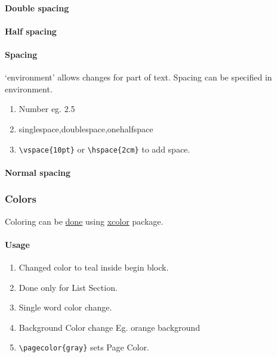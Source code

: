 \documentclass{report}[a4paper,12pt] %
\begin{document}
\paragraph{Double spacing}
\doublespacing
\lipsum[1]

\paragraph{Half spacing}
\onehalfspacing
\lipsum[1]

\begin{spacing}{2.5}
\paragraph{Spacing} `environment' allows changes for part of text.
Spacing can be specified in environment.
\begin{enumerate}
  \item Number eg. 2.5
  \item singlespace,doublespace,onehalfspace
  \item \verb|\vspace{10pt}| or \verb|\hspace{2cm}| to add space.
\end{enumerate}

\lipsum[1]
\end{spacing}

\paragraph{Normal spacing}
\lipsum[1]

\subsubsection{Colors}
Coloring can be \href{https://www.overleaf.com/learn/latex/Using_colours_in_LaTeX}{done} using \href{https://mirrors.sjtug.sjtu.edu.cn/ctan/macros/latex/contrib/xcolor/xcolor.pdf}{xcolor} package.

\paragraph{Usage}
\begin{enumerate}
  \color{teal}
  \item Changed color to teal inside begin block.
  \item Done only for List Section.
  \item Single \textcolor{Sepia}{word} color change.
  \item Background Color change Eg. \colorbox{BurntOrange}{orange background}
  \item \verb|\pagecolor{gray}| sets Page Color.
\end{enumerate}
\end{document}
